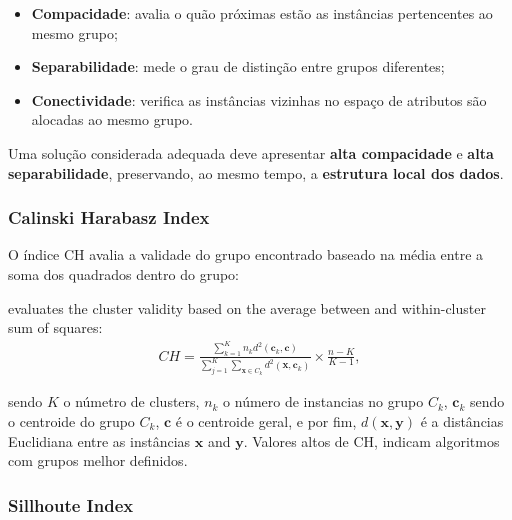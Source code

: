 \begin{itemize}
    \item \textbf{Compacidade}: avalia o quão próximas estão as instâncias pertencentes ao mesmo grupo;

    \item \textbf{Separabilidade}: mede o grau de distinção entre grupos diferentes;

    \item \textbf{Conectividade}: verifica as instâncias vizinhas no espaço de atributos são alocadas ao mesmo grupo.
\end{itemize}


Uma solução considerada adequada deve apresentar \textbf{alta compacidade} e \textbf{alta separabilidade}, preservando, ao mesmo tempo, a \textbf{estrutura local dos dados}.

\subsubsection{Calinski Harabasz Index}

O índice \gls{CH} \cite{calinski1974dendrite} avalia a validade do grupo encontrado baseado na média entre a soma dos quadrados dentro do grupo:

 evaluates the cluster validity based on the average between and within-cluster sum of squares:
\begin{align}
CH = \frac{\sum_{k=1}^K n_k d^2(\mathbf{c}_k,\mathbf{c})}{\sum_{j=1}^K \sum_{\mathbf{x} \in C_k} d^2(\mathbf{x},\mathbf{c}_k)} \times \frac{n-K}{K-1},
\end{align}


sendo $K$ o númetro de clusters, $n_k$ o número de instancias no grupo $C_k$, $\mathbf{c}_k$ sendo o centroide do grupo $C_k$, $\mathbf{c}$ é o centroide geral, e por fim, $d(\mathbf{x},\mathbf{y})$ 
é a distâncias Euclidiana entre as instâncias $\mathbf{x}$ and $\mathbf{y}$. Valores altos de \gls{CH}, indicam algoritmos com grupos melhor definidos.

\subsubsection{Sillhoute Index}


